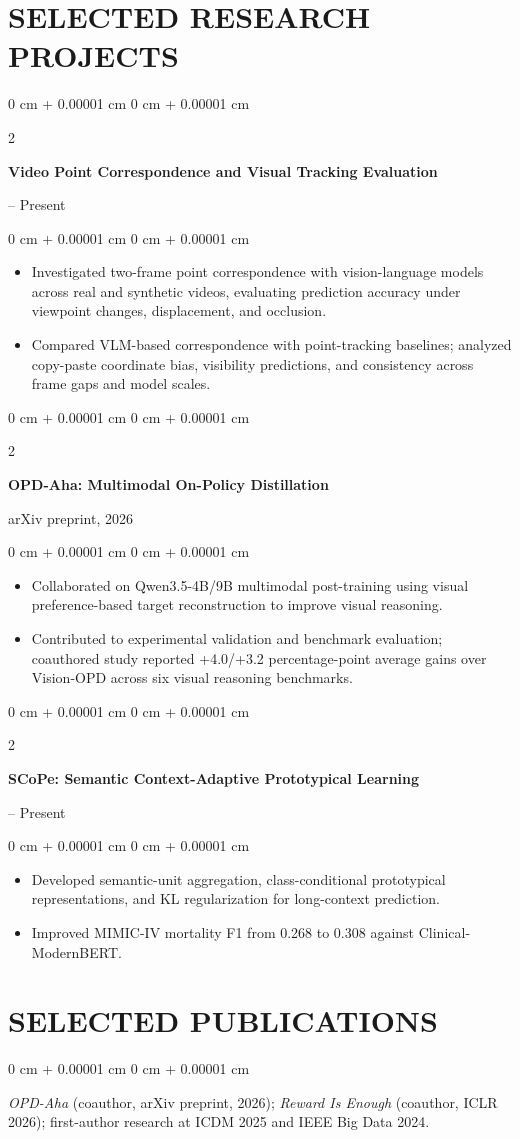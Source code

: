 \documentclass[10pt, letterpaper]{article}
\newenvironment{highlights}{
    \begin{itemize}[
        topsep=0.10 cm,
        parsep=0.10 cm,
        partopsep=0pt,
        itemsep=0pt,
        leftmargin=0 cm + 10pt
    ]
}{
    \end{itemize}
} %
\newenvironment{onecolentry}{
    \begin{adjustwidth}{
        0 cm + 0.00001 cm
    }{
        0 cm + 0.00001 cm
    }
}{
    \end{adjustwidth}
} %
\newenvironment{twocolentry}[2][]{
    \onecolentry
    \def\secondColumn{#2}
    \setcolumnwidth{\fill, 4.5 cm}
    \begin{paracol}{2}
}{
    \switchcolumn \raggedleft \secondColumn
    \end{paracol}
    \endonecolentry
} %
\begin{document}
\section{SELECTED RESEARCH PROJECTS}
\begin{twocolentry}{2026 -- Present}
\textbf{Video Point Correspondence and Visual Tracking Evaluation}
\end{twocolentry}
\begin{onecolentry}
\begin{highlights}
\item Investigated two-frame point correspondence with vision-language models across real and synthetic videos, evaluating prediction accuracy under viewpoint changes, displacement, and occlusion.
\item Compared VLM-based correspondence with point-tracking baselines; analyzed copy-paste coordinate bias, visibility predictions, and consistency across frame gaps and model scales.
\end{highlights}
\end{onecolentry}
\vspace{0.03 cm}
\begin{twocolentry}{arXiv preprint, 2026}
\textbf{OPD-Aha: Multimodal On-Policy Distillation}
\end{twocolentry}
\begin{onecolentry}
\begin{highlights}
\item Collaborated on Qwen3.5-4B/9B multimodal post-training using visual preference-based target reconstruction to improve visual reasoning.
\item Contributed to experimental validation and benchmark evaluation; coauthored study reported +4.0/+3.2 percentage-point average gains over Vision-OPD across six visual reasoning benchmarks.
\end{highlights}
\end{onecolentry}
\vspace{0.03 cm}
\begin{twocolentry}{2026 -- Present}
\textbf{SCoPe: Semantic Context-Adaptive Prototypical Learning}
\end{twocolentry}
\begin{onecolentry}
\begin{highlights}
\item Developed semantic-unit aggregation, class-conditional prototypical representations, and KL regularization for long-context prediction.
\item Improved MIMIC-IV mortality F1 from 0.268 to 0.308 against Clinical-ModernBERT.
\end{highlights}
\end{onecolentry}
\section{SELECTED PUBLICATIONS}
\begin{onecolentry}
\textit{OPD-Aha} (coauthor, arXiv preprint, 2026); \textit{Reward Is Enough} (coauthor, ICLR 2026); first-author research at ICDM 2025 and IEEE Big Data 2024.
\end{onecolentry}
\end{document}
